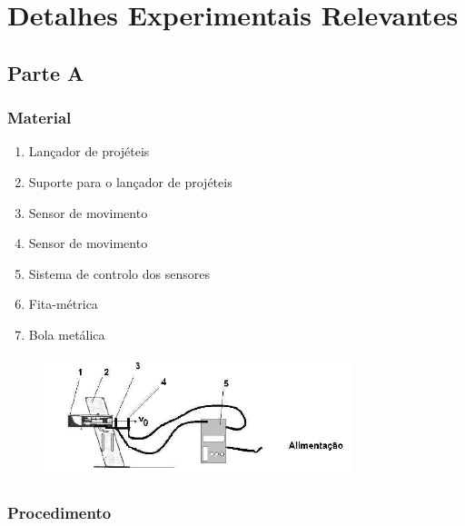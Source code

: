 
\chapter{Detalhes Experimentais Relevantes}
\label{ch:detalhes-experimentais-relevantes}
{

\section{Parte A}
\label{sec:detalhes-experimentais-relevantes-parte1}

\subsection{Material}
\label{subsec:detalhes-experimentais-relevantes-parte1-material}

\begin{enumerate}
    \item Lançador de projéteis
    \item Suporte para o lançador de projéteis
    \item Sensor de movimento
    \item Sensor de movimento
    \item Sistema de controlo dos sensores
    \item Fita-métrica
    \item Bola metálica
\end{enumerate}

\begin{figure}[h]
    \center
    \includegraphics[width=0.8\textwidth]{images/montagem-experimental-parte1}\label{fig:montagem-experimental-parte1}
\end{figure}

\subsection{Procedimento}
\label{subsec:detalhes-experimentais-relevantes-parte1-procedimento}

}

